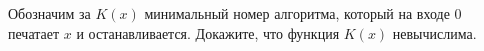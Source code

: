 Обозначим за $K(x)$ минимальный номер алгоритма, который на входе $0$ печатает $x$ и
останавливается. Докажите, что функция $K(x)$ невычислима.
